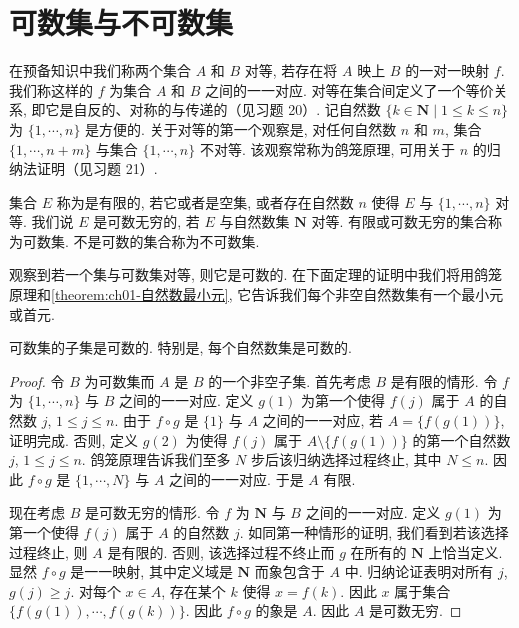 \documentclass[../../main.tex]{subfiles}
\begin{document}
\section{可数集与不可数集}\label{section:ch01-可数不可数}

在预备知识中我们称两个集合 $A$ 和 $B$ 对等, 若存在将 $A$ 映上 $B$ 的一对一映射 $f$. 我们称这样的 $f$ 为集合 $A$ 和 $B$ 之间的一一对应. 对等在集合间定义了一个等价关系, 即它是自反的、对称的与传递的（见习题 20）. 记自然数 $\{k\in\mathbf{N}\mid 1\leqslant k\leqslant n\}$ 为 $\{1,\cdots,n\}$ 是方便的. 关于对等的第一个观察是, 对任何自然数 $n$ 和 $m$, 集合 $\{1,\cdots,n+m\}$ 与集合 $\{1,\cdots,n\}$ 不对等. 该观察常称为鸽笼原理, 可用关于 $n$ 的归纳法证明（见习题 21）.

\begin{definition}\label{definition:ch01-可数}
集合 $E$ 称为是有限的, 若它或者是空集, 或者存在自然数 $n$ 使得 $E$ 与 $\{1,\cdots,n\}$ 对等. 我们说 $E$ 是可数无穷的, 若 $E$ 与自然数集 $\mathbf{N}$ 对等. 有限或可数无穷的集合称为可数集. 不是可数的集合称为不可数集.
\end{definition}

观察到若一个集与可数集对等, 则它是可数的. 在下面定理的证明中我们将用鸽笼原理和\cref{theorem:ch01-自然数最小元}, 它告诉我们每个非空自然数集有一个最小元或首元.

\begin{theorem}\label{theorem:ch01-可数子集}
可数集的子集是可数的. 特别是, 每个自然数集是可数的.
\end{theorem}

\begin{proof}
令 $B$ 为可数集而 $A$ 是 $B$ 的一个非空子集. 首先考虑 $B$ 是有限的情形. 令 $f$ 为 $\{1,\cdots,n\}$ 与 $B$ 之间的一一对应. 定义 $g(1)$ 为第一个使得 $f(j)$ 属于 $A$ 的自然数 $j$, $1\leqslant j\leqslant n$. 由于 $f\circ g$ 是 $\{1\}$ 与 $A$ 之间的一一对应, 若 $A=\{f(g(1))\}$, 证明完成. 否则, 定义 $g(2)$ 为使得 $f(j)$ 属于 $A\setminus\{f(g(1))\}$ 的第一个自然数 $j$, $1\leqslant j\leqslant n$. 鸽笼原理告诉我们至多 $N$ 步后该归纳选择过程终止, 其中 $N\leqslant n$. 因此 $f\circ g$ 是 $\{1,\cdots,N\}$ 与 $A$ 之间的一一对应. 于是 $A$ 有限.

现在考虑 $B$ 是可数无穷的情形. 令 $f$ 为 $\mathbf{N}$ 与 $B$ 之间的一一对应. 定义 $g(1)$ 为第一个使得 $f(j)$ 属于 $A$ 的自然数 $j$. 如同第一种情形的证明, 我们看到若该选择过程终止, 则 $A$ 是有限的. 否则, 该选择过程不终止而 $g$ 在所有的 $\mathbf{N}$ 上恰当定义. 显然 $f\circ g$ 是一一映射, 其中定义域是 $\mathbf{N}$ 而象包含于 $A$ 中. 归纳论证表明对所有 $j$, $g(j)\geqslant j$. 对每个 $x\in A$, 存在某个 $k$ 使得 $x=f(k)$. 因此 $x$ 属于集合 $\{f(g(1)),\cdots,f(g(k))\}$. 因此 $f\circ g$ 的象是 $A$. 因此 $A$ 是可数无穷.
\end{proof}
\end{document}
